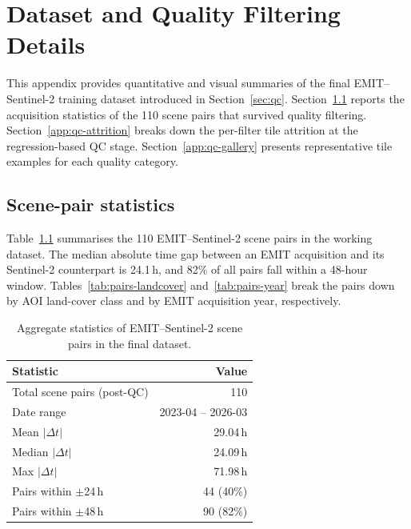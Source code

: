 \chapter{Dataset and Quality Filtering Details}
\label{app:dataset}

This appendix provides quantitative and visual summaries of the final
EMIT--Sentinel-2 training dataset introduced in Section~\ref{sec:qc}.
Section~\ref{app:pair-stats} reports the acquisition statistics of the
110 scene pairs that survived quality filtering. Section~\ref{app:qc-attrition}
breaks down the per-filter tile attrition at the regression-based QC
stage. Section~\ref{app:qc-gallery} presents representative tile
examples for each quality category.


\section{Scene-pair statistics}
\label{app:pair-stats}

Table~\ref{tab:pairs-summary} summarises the 110 EMIT--Sentinel-2 scene
pairs in the working dataset. The median absolute time gap between an
EMIT acquisition and its Sentinel-2 counterpart is 24.1\,h, and 82\% of
all pairs fall within a 48-hour window. Tables~\ref{tab:pairs-landcover}
and~\ref{tab:pairs-year} break the pairs down by AOI land-cover class
and by EMIT acquisition year, respectively.

\begin{table}[h]
  \centering
  \begin{tabular}{lr}
    \toprule
    Statistic & Value \\
    \midrule
    Total scene pairs (post-QC) & 110 \\
    Date range & 2023-04 -- 2026-03 \\
    Mean $|\Delta t|$ & 29.04\,h \\
    Median $|\Delta t|$ & 24.09\,h \\
    Max $|\Delta t|$ & 71.98\,h \\
    Pairs within $\pm$24\,h & 44 (40\%) \\
    Pairs within $\pm$48\,h & 90 (82\%) \\
    \bottomrule
  \end{tabular}
  \caption{Aggregate statistics of EMIT--Sentinel-2 scene pairs in the
    final dataset.}
  \label{tab:pairs-summary}
\end{table}

